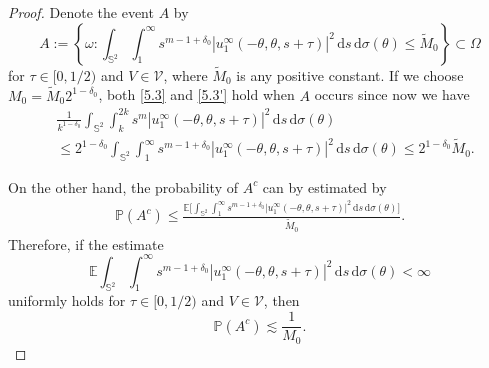 \documentclass[reqno, 12pt]{amsart}
\numberwithin{equation}{section}
\begin{document}
 \begin{proof}
Denote the event $A$ by \begin{equation}\label{5.4}A:=\left\{\omega:\int_{\mathbb S^2}\int_1^\infty s^{m-1+{\delta_0}}|u^\infty_1(-\theta,\theta,s+\tau)|^2\,\mathrm{d}s\,\mathrm{d}\sigma(\theta) \le \widetilde M_0\right\} \subset \Omega
\end{equation} for $\tau \in [0,1/2)$ and $V \in\mathcal V$, where $\widetilde M_0$ is any positive constant. If we choose $M_0=\widetilde M_0 2^{1-\delta_0}$,  both \eqref{5.3} and \eqref{5.3'} hold when $A $ occurs since now we have \begin{align*}
    &\frac{1}{k^{1-\delta_0}}\int_{\mathbb S^2}\int_k^{2k}s^m|u^\infty_1(-\theta,\theta,s+\tau)|^2\,\mathrm{d}s\,\mathrm{d}\sigma(\theta) \\ &\le 2^{1-\delta_0}\int_{\mathbb S^2}\int_1^\infty s^{m-1+{\delta_0}}|u^\infty_1(-\theta,\theta,s+\tau)|^2\,\mathrm{d}s\,\mathrm{d}\sigma(\theta) \le 2^{1-\delta_0}\widetilde M_0.
\end{align*} 

On the other hand, the probability of $A^c$ can by estimated by\begin{align*}
    \mathbb P(A^c) \le \frac{\mathbb E\Big[\int_{\mathbb{S}^2}\int_1^\infty s^{m-1+\delta_0}|u^\infty_1(-\theta,\theta,s+\tau)|^2\,\mathrm{d}s \,\mathrm{d}\sigma(\theta)\Big]}{\widetilde M_0}.
\end{align*}
Therefore, if the estimate \begin{equation}\label{5.5}
	\mathbb E \int_{\mathbb{S}^2}\int_1^\infty s^{m-1+\delta_0}|u^\infty_1(-\theta,\theta,s+\tau)|^2\,\mathrm{d}s \,\mathrm{d}\sigma(\theta)< \infty
\end{equation} uniformly holds for $\tau \in [0,1/2)$ and $V \in\mathcal V$, then  \[
\mathbb P(A^c) \lesssim \frac{1}{M_0}.
\] 


\end{proof}
\end{document}
